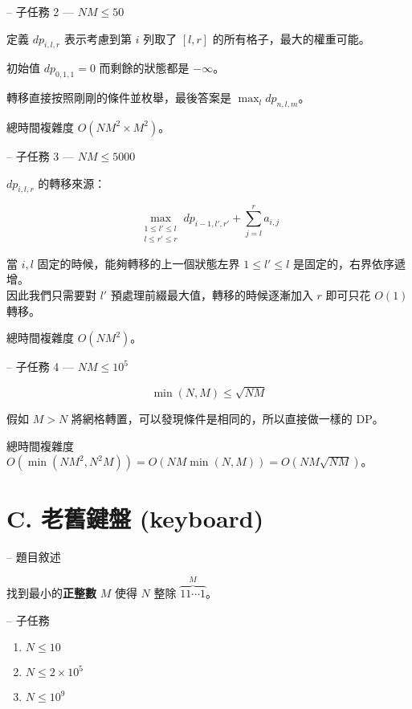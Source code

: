 \documentclass[hyperref,UTF8,notheorems,xcolor={dvipsnames}]{beamer}
\newcommand{\btitle}[1]{{\secname} -- #1}
\theoremstyle{definition}
\begin{document}
\begin{frame}[fragile]{\btitle{子任務 2 --- $NM \leq 50$}}
	
	定義 $dp_{i, l, r}$ 表示考慮到第 $i$ 列取了 $[l, r]$ 的所有格子，最大的權重可能。  

	初始值 $dp_{0, 1, 1} = 0$ 而剩餘的狀態都是 $- \infty$。  

	轉移直接按照剛剛的條件並枚舉，最後答案是 $\max_{l} dp_{n,l,m}$。  

	總時間複雜度 $O(NM^2 \times M^2)$。  

\end{frame}

\begin{frame}[fragile]{\btitle{子任務 3 --- $NM \leq 5000$}}
	
	$dp_{i, l, r}$ 的轉移來源：
	
	\[ \max_{\substack{1 \leq l' \leq l \\ l \leq r' \leq r}} dp_{i-1, l', r'} + \sum_{j=l}^{r}a_{i,j} \]
	
	當 $i, l$ 固定的時候，能夠轉移的上一個狀態左界 $1 \leq l' \leq l$ 是固定的，右界依序遞增。\\
	因此我們只需要對 $l'$ 預處理前綴最大值，轉移的時候逐漸加入 $r$ 即可只花 $O(1)$ 轉移。

	總時間複雜度 $O(NM^2)$。  

\end{frame}

\begin{frame}[fragile]{\btitle{子任務 4 --- $NM \leq 10^5$}}
	
	\[ \min(N, M) \leq \sqrt{NM} \]

	假如 $M > N$ 將網格轉置，可以發現條件是相同的，所以直接做一樣的 DP。  

	總時間複雜度 $O(\min(NM^2, N^2M)) = O(NM\min(N, M)) = O(NM\sqrt{NM})$。  

\end{frame}

\section{C. 老舊鍵盤 (keyboard)}

\begin{frame}[fragile]{\btitle{題目敘述}}

	找到最小的\textbf{正整數} $M$ 使得 $N$ 整除 $\overset{M}{\overbrace{11\cdots1}}$。
\end{frame}

\begin{frame}[fragile]{\btitle{子任務}}
	\begin{enumerate}
		\item $N \leq 10$
		\item $N \leq 2 \times 10^5$
		\item $N \leq 10^9$
	\end{enumerate}
\end{frame}
\end{document}
